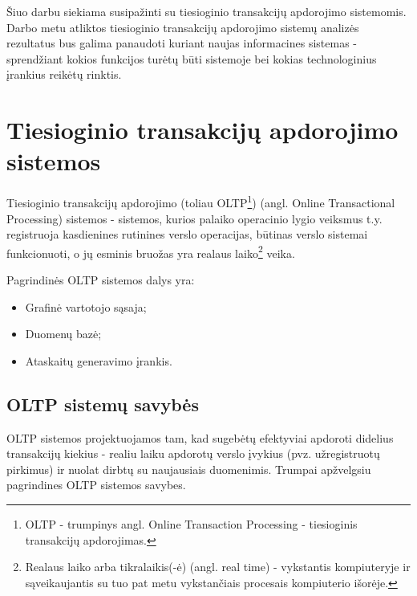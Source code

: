 \documentclass[12pt,a4paper,titlepage]{article}
\begin{document}
Šiuo darbu siekiama susipažinti su tiesioginio transakcijų apdorojimo sistemomis. Darbo metu atliktos tiesioginio transakcijų apdorojimo sistemų analizės rezultatus bus galima panaudoti kuriant naujas informacines sistemas - sprendžiant kokios funkcijos turėtų būti sistemoje bei kokias technologinius įrankius reikėtų rinktis.

\section{Tiesioginio transakcijų apdorojimo sistemos}

\begin{comment}
Online transactional processing (OLTP) is designed to efficiently process high volumes of transactions, instantly recording business events (such as a sales invoice payment) and reflecting changes as they occur.
\end{comment}

Tiesioginio transakcijų apdorojimo (toliau OLTP\footnote{OLTP - trumpinys angl. Online Transaction Processing - tiesioginis transakcijų apdorojimas.}) (angl. Online Transactional Processing) sistemos - sistemos, kurios palaiko operacinio lygio veiksmus t.y. registruoja kasdienines rutinines verslo operacijas, būtinas verslo sistemai funkcionuoti, o jų esminis bruožas yra realaus laiko\footnote{Realaus laiko arba tikralaikis(-ė) (angl. real time) - vykstantis kompiuteryje ir sąveikaujantis su tuo pat metu vykstančiais procesais kompiuterio išorėje.\cite{DGJ08}} veika.

Pagrindinės OLTP sistemos dalys yra:
\begin{itemize}
	\item Grafinė vartotojo sąsaja;
	\item Duomenų bazė;
	\item Ataskaitų generavimo įrankis.
\end{itemize}

\subsection{OLTP sistemų savybės}

OLTP sistemos projektuojamos tam, kad sugebėtų efektyviai apdoroti didelius transakcijų kiekius - realiu laiku apdorotų verslo įvykius (pvz. užregistruotų pirkimus) ir nuolat dirbtų su naujausiais duomenimis. Trumpai apžvelgsiu pagrindines OLTP sistemos savybes.\\
\begin{comment}
The nature of OLTP environments is predominantly any kind of interactive ad hoc usage, such as telemarketeers entering telephone survey results. OLTP systems require short response times in order for users to remain productive.
\end{comment}
\end{document}
